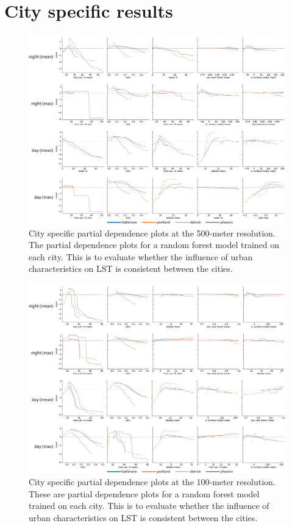 \documentclass[final,3p,times,onecolumn,sort&compress]{elsarticle}
\begin{document}
\section{City specific results}
\label{ss:city}
\begin{figure}[h]
    \centering
    \includegraphics[width=\linewidth]{fig/report/pdp_cities_500.png}
    \caption[City specific partial dependence plots at the 500-meter resolution]{
    City specific partial dependence plots at the 500-meter resolution.
    The partial dependence plots for a random forest model trained on each city.
    This is to evaluate whether the influence of urban characteristics on LST is consistent between the cities.
    }
    \label{fig:cities_500}
\end{figure}

\begin{figure}[h]
    \centering
    \includegraphics[width=\linewidth]{fig/report/pdp_cities_100.png}
    \caption[City specific partial dependence plots at the 100-meter resolution]{
    City specific partial dependence plots at the 100-meter resolution.
    These are partial dependence plots for a random forest model trained on each city.
    This is to evaluate whether the influence of urban characteristics on LST is consistent between the cities.
    }
    \label{fig:cities_100}
\end{figure}
\end{document}
